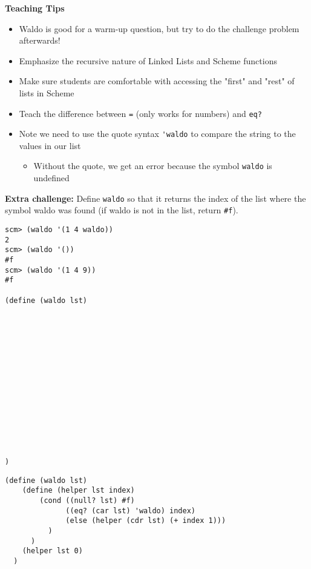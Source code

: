 \begin{blocksection}
\begin{guide}
\textbf{Teaching Tips}
\begin{itemize}
  \item Waldo is good for a warm-up question, but try to do the challenge problem afterwards!
  \item Emphasize the recursive nature of Linked Lists and Scheme functions
  \item Make sure students are comfortable with accessing the "first" and "rest" of lists in Scheme
  \item Teach the difference between \lstinline{=} (only works for numbers) and \lstinline{eq?}
  \item Note we need to use the quote syntax \lstinline{'waldo} to compare the string to the values in our list
  \begin{itemize}
    \item Without the quote, we get an error because the symbol \lstinline{waldo} is undefined
  \end{itemize}
\end{itemize}
\end{guide}
\end{blocksection}

\begin{blocksection}

\question \textbf{Extra challenge:} Define \texttt{waldo} so that it returns the index of
the list where the symbol waldo was found (if waldo is not in the list, return
\texttt{\#f}).
\begin{lstlisting}
scm> (waldo '(1 4 waldo))
2
scm> (waldo '())
#f
scm> (waldo '(1 4 9))
#f

(define (waldo lst)















)
\end{lstlisting}

\begin{solution}[0.5in]
\begin{lstlisting}
(define (waldo lst)
    (define (helper lst index)
        (cond ((null? lst) #f)
              ((eq? (car lst) 'waldo) index)
              (else (helper (cdr lst) (+ index 1)))
          )
      )
    (helper lst 0)
  )
\end{lstlisting}
\end{solution}
\end{blocksection}

